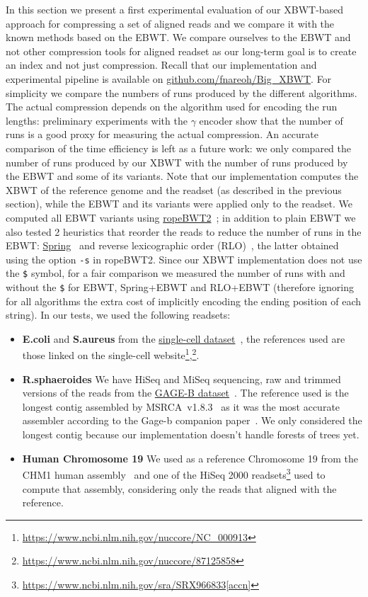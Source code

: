 In this section we present a first experimental evaluation of our XBWT-based approach for compressing a set of aligned reads and we compare it with the known methods based on the EBWT. We compare ourselves to the EBWT and not other compression tools for aligned readset as our long-term goal is to create an index and not just compression. Recall that our implementation and experimental pipeline is available on \href{https://github.com/fnareoh/Big_XBWT}{ github.com/fnareoh/Big\_XBWT}. For simplicity we compare the numbers of runs produced by the different algorithms. The actual compression depends on the algorithm used for encoding the run lengths: preliminary experiments with the $\gamma$ encoder show that the number of runs is a good proxy for measuring the actual compression. An accurate comparison of the time efficiency is left as a future work: we only compared the number of runs produced by our XBWT with the number of runs produced by the EBWT and some of its variants. Note that our implementation computes the XBWT of the reference genome and the readset (as described in the previous section), while the EBWT and its variants were applied only to the readset. We computed all EBWT variants using \href{https://github.com/lh3/ropebwt2}{{ropeBWT2}}~\cite{ropebwt2}; in addition to plain EBWT we also tested 2 heuristics that reorder the reads to reduce the number of runs in the EBWT: \href{https://github.com/shubhamchandak94/Spring/tree/reorder-only}{{Spring}}~\cite{spring} and reverse lexicographic order (RLO)~\cite{cox2012large}, the latter obtained using the option \texttt{-s} in ropeBWT2. Since our XBWT implementation does not use the \texttt{\$} symbol, for a fair comparison we measured the number of runs with and without the \texttt{\$} for EBWT, Spring+EBWT and RLO+EBWT (therefore ignoring for all algorithms the extra cost of implicitly encoding the ending position of each string). 
In our tests, we used the following readsets:
\begin{itemize}
    \item \textbf{E.coli} and \textbf{S.aureus} from the \href{http://bix.ucsd.edu/projects/singlecell/nbt_data.html}{{single-cell dataset}}~\cite{single-cell}, the references used are those linked on the single-cell website\footnote{\url{https://www.ncbi.nlm.nih.gov/nuccore/NC_000913}},\footnote{\url{https://www.ncbi.nlm.nih.gov/nuccore/87125858}}.
    \item \textbf{R.sphaeroides} We have HiSeq and MiSeq sequencing, raw and trimmed versions of the reads from the \href{https://ccb.jhu.edu/gage_b/}{GAGE-B dataset}~\cite{Gage-b}. The reference used is the longest contig assembled by MSRCA~v1.8.3~\cite{MSRCA} as it was the most accurate assembler according to the Gage-b companion paper~\cite{Gage-b}. We only considered the longest contig because our implementation doesn't handle forests of trees yet.
    \item \textbf{Human Chromosome 19}  We used
    as a reference Chromosome 19 from the CHM1 human assembly~\cite{chr19_chm1} and one of the HiSeq 2000 readsets\footnote{\url{https://www.ncbi.nlm.nih.gov/sra/SRX966833[accn]}} used to compute that assembly, considering only the reads that aligned with the reference.
\end{itemize}

